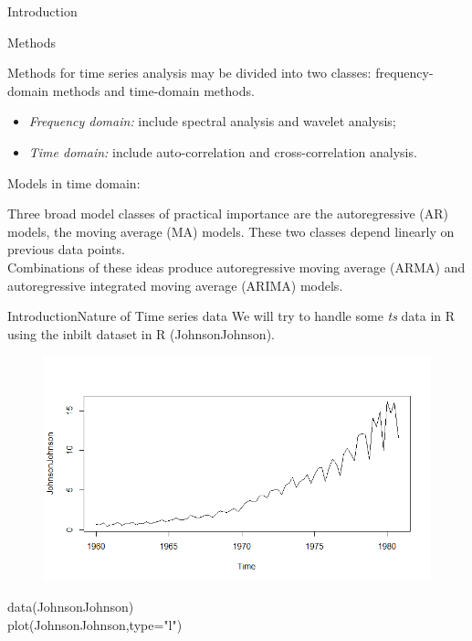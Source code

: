 \documentclass{beamer}
\begin{document}
\begin{frame}{Introduction}
\begin{block}{Methods}
	{\small
Methods for time series analysis may be divided into two classes: frequency-domain methods and time-domain methods.
\pause
\begin{itemize}
\item \textit{Frequency domain:} include spectral analysis and wavelet analysis;
\item \textit{Time domain:} include auto-correlation and cross-correlation analysis.  %
\end{itemize}
}
\end{block}


\begin{block}{Models in time domain:}

{\small Three broad model classes of practical importance are the autoregressive (AR) models, the moving average (MA) models. These two classes depend linearly on previous data points. \\
	
Combinations of these ideas produce autoregressive moving average (ARMA) and autoregressive integrated moving average (ARIMA) models. }
\end{block}

\end{frame}

\begin{frame}{Introduction}{Nature of Time series data}	
We will try to handle some \textit{ts} data in R using the inbilt dataset in R (JohnsonJohnson). 
	
	\begin{figure}
		\centering
		\includegraphics[width=0.7\linewidth]{j&jplot}
	\end{figure}
	{\footnotesize 
		data(JohnsonJohnson)\\
		plot(JohnsonJohnson,type="l")
	}
	
\end{frame}
\end{document}

